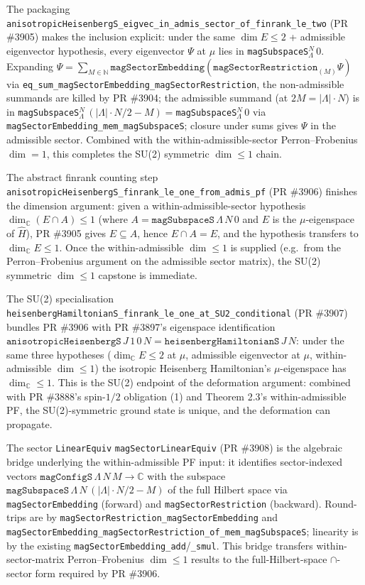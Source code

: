 \documentclass[a4paper,11pt]{article}
\begin{document}
The packaging
\texttt{anisotropicHeisenbergS\_eigvec\_in\_admis\_sector\_of\_finrank\_le\_two}
(PR \#3905) makes the inclusion explicit: under the same \(\dim E\le 2\) +
admissible eigenvector hypothesis, every eigenvector \(\Psi\) at \(\mu\) lies in
\texttt{magSubspaceS}\(_\Lambda^N\,0\).  Expanding
\(\Psi=\sum_{M\in\mathbb N}\texttt{magSectorEmbedding}(\texttt{magSectorRestriction}_{(M)}\Psi)\)
via \texttt{eq\_sum\_magSectorEmbedding\_magSectorRestriction}, the non-admissible
summands are killed by PR \#3904; the admissible summand (at \(2M=|\Lambda|\cdot
N\)) is in
\texttt{magSubspaceS}\(_\Lambda^N\,(|\Lambda|\cdot N/2-M)=\)\texttt{magSubspaceS}\(_\Lambda^N\,0\)
via \texttt{magSectorEmbedding\_mem\_magSubspaceS}; closure under sums gives
\(\Psi\) in the admissible sector.  Combined with the within-admissible-sector
Perron–Frobenius \(\dim=1\), this completes the SU(2) symmetric \(\dim\le1\)
chain.

The abstract finrank counting step
\texttt{anisotropicHeisenbergS\_finrank\_le\_one\_from\_admis\_pf} (PR \#3906)
finishes the dimension argument: given a within-admissible-sector hypothesis
\(\dim_{\mathbb C}(E\cap A)\le1\) (where
\(A=\texttt{magSubspaceS}\,\Lambda\,N\,0\) and \(E\) is the \(\mu\)-eigenspace
of \(\hat H\)), PR \#3905 gives \(E\subseteq A\), hence \(E\cap A=E\), and the
hypothesis transfers to \(\dim_{\mathbb C}E\le1\).  Once the within-admissible
\(\dim\le1\) is supplied (e.g.\ from the Perron–Frobenius argument on the
admissible sector matrix), the SU(2) symmetric \(\dim\le1\) capstone is
immediate.

The SU(2) specialisation
\texttt{heisenbergHamiltonianS\_finrank\_le\_one\_at\_SU2\_conditional} (PR
\#3907) bundles PR \#3906 with PR \#3897's eigenspace identification
\(\texttt{anisotropicHeisenbergS}\,J\,1\,0\,N=\texttt{heisenbergHamiltonianS}\,J\,N\):
under the same three hypotheses (\(\dim_{\mathbb C}E\le2\) at \(\mu\),
admissible eigenvector at \(\mu\), within-admissible \(\dim\le1\)) the
isotropic Heisenberg Hamiltonian's \(\mu\)-eigenspace has
\(\dim_{\mathbb C}\le1\).  This is the SU(2) endpoint of the deformation
argument: combined with PR \#3888's spin-\(1/2\) obligation (1) and Theorem 2.3's
within-admissible PF, the SU(2)-symmetric ground state is unique, and the
deformation can propagate.

The sector \texttt{LinearEquiv} \texttt{magSectorLinearEquiv} (PR \#3908) is the
algebraic bridge underlying the within-admissible PF input: it identifies
sector-indexed vectors \(\texttt{magConfigS}\,\Lambda\,N\,M\to\mathbb C\) with
the subspace
\(\texttt{magSubspaceS}\,\Lambda\,N\,(|\Lambda|\cdot N/2-M)\) of the full
Hilbert space via \texttt{magSectorEmbedding} (forward) and
\texttt{magSectorRestriction} (backward).  Round-trips are by
\texttt{magSectorRestriction\_magSectorEmbedding} and
\texttt{magSectorEmbedding\_magSectorRestriction\_of\_mem\_magSubspaceS};
linearity is by the existing \texttt{magSectorEmbedding\_add}/\texttt{\_smul}.
This bridge transfers within-sector-matrix Perron–Frobenius
\(\dim\le1\) results to the full-Hilbert-space \(\cap\)-sector form required by
PR \#3906.
\end{document}
